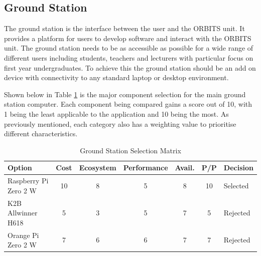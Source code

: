 \documentclass[a4paper,12pt,titlepage]{report}
\begin{document}
\subsection{Ground Station}
The ground station is the interface between the user and the ORBITS unit. It provides a platform for users to develop software and interact with the ORBITS unit. The ground station needs to be as accessible as possible for a wide range of different users including students, teachers and lecturers with particular focus on first year undergraduates. To achieve this the ground station should be an add on device with connectivity to any standard laptop or desktop environment.

Shown below in Table \ref{tab:ground_station_selection_matrix} is the major component selection for the main ground station computer. Each component being compared gains a score out of 10, with 1 being the least applicable to the application and 10 being the most. As previously mentioned, each category also has a weighting value to prioritise different characteristics.

\begin{table}[h]
\centering
\caption{Ground Station Selection Matrix}
\label{tab:ground_station_selection_matrix}
\begin{tabular}{|p{3cm}|c|c|c|c|c|p{2.5cm}|}
\hline
\textbf{Option} & \textbf{Cost} & \textbf{Ecosystem} & \textbf{Performance} & \textbf{Avail.} & \textbf{P/P} & \textbf{Decision} \\ \hline
Raspberry Pi Zero 2 W & 10 & 8 & 5 & 8 & 10 & Selected \\ \hline
K2B Allwinner H618 & 5 & 3 & 5 & 7 & 5 & Rejected \\ \hline
Orange Pi Zero 2 W & 7 & 6 & 6 & 7 & 7 & Rejected \\ \hline
\end{tabular}
\end{table}
\end{document}
